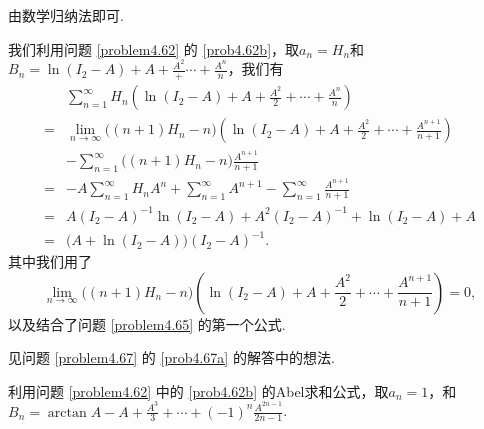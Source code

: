 \begin{solution}
  \begin{inparaenum}[(a)]
    \item 由数学归纳法即可.

    \item 我们利用问题 \ref{problem4.62} 的 \ref{prob4.62b}，取$a_n=H_n$和$B_n=\ln(I_2-A)
        +A+\frac{A^2}+\cdots+\frac{A^n}n$，我们有
        \begin{align*}
          & \sum_{n=1}^\infty H_n\left( \ln(I_2-A) + A + \frac{A^2}2 + \cdots + \frac{A^n}n \right) \\
          = {}& \lim_{n\to\infty} \big( (n+1)H_n- n \big) \left( \ln(I_2-A) + A + \frac{A^2}2 + \cdots + \frac{A^{n+1}}{n+1} \right) \\
          & - \sum_{n=1}^\infty \big( (n+1)H_n- n \big) \frac{A^{n+1}}{n+1} \\
          = {}& -A\sum_{n=1}^\infty H_nA^n + \sum_{n=1}^\infty A^{n+1} - \sum_{n=1}^\infty \frac{A^{n+1}}{n+1} \\
          = {}& A(I_2-A)^{-1}\ln(I_2-A) + A^2(I_2-A)^{-1} + \ln(I_2-A) + A \\
          = {}& \big( A + \ln(I_2-A) \big) (I_2 - A)^{-1}.
        \end{align*}
    其中我们用了
        \[
          \lim_{n\to\infty} \big( (n+1)H_n- n \big) \left( \ln(I_2-A) + A + \frac{A^2}2 + \cdots + \frac{A^{n+1}}{n+1} \right) = 0,
        \]
    以及结合了问题 \ref{problem4.65} 的第一个公式.
  \end{inparaenum}
\end{solution}

\begin{solution}
  \begin{inparaenum}[(a)]
    \item 见问题 \ref{problem4.67} 的 \ref{prob4.67a} 的解答中的想法.

    \item 利用问题 \ref{problem4.62} 中的 \ref{prob4.62b} 的Abel求和公式，取$a_n=1$，和$B_n=\arctan A-A+\frac{A^3}3+\cdots+(-1)^n
        \frac{A^{2n-1}}{2n-1}$.
  \end{inparaenum}
\end{solution}

